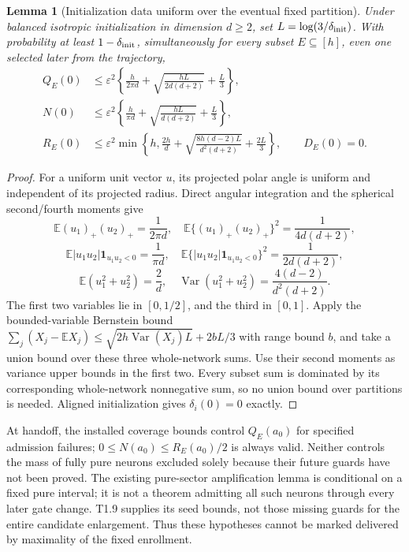 \documentclass{article} %
\theoremstyle{plain}
\newtheorem{lemma}[theorem]{Lemma}
\theoremstyle{definition}
\theoremstyle{remark}
\begin{document}
\begin{lemma}[Initialization data uniform over the eventual fixed partition]
\label{sbcouple:init}
Under balanced isotropic initialization in dimension $d\ge2$, set
$L=\log(3/\delta_{\rm init})$. With probability at least
$1-\delta_{\rm init}$, simultaneously for every subset $E\subseteq[h]$,
even one selected later from the trajectory,
\begin{align*}
 Q_E(0)&\le\varepsilon^2\left\{\frac{h}{2\pi d}
       +\sqrt{\frac{hL}{2d(d+2)}}+\frac L3\right\},\\
 N(0)&\le\varepsilon^2\left\{\frac{h}{\pi d}
       +\sqrt{\frac{hL}{d(d+2)}}+\frac L3\right\},\\
 R_E(0)&\le\varepsilon^2\min\left\{h,\frac{2h}d
       +\sqrt{\frac{8h(d-2)L}{d^2(d+2)}}+\frac{2L}3\right\},
 \qquad D_E(0)=0.
\end{align*}
\end{lemma}
\begin{proof}
For a uniform unit vector $u$, its projected polar angle is uniform and
independent of its projected radius. Direct angular integration and the
spherical second/fourth moments give
\[
 \mathbb E(u_1)_+(u_2)_+=\frac1{2\pi d},\quad
 \mathbb E\{(u_1)_+(u_2)_+\}^2=\frac1{4d(d+2)},
\]
\[
 \mathbb E|u_1u_2|\mathbf1_{u_1u_2<0}=\frac1{\pi d},\quad
 \mathbb E\{|u_1u_2|\mathbf1_{u_1u_2<0}\}^2=\frac1{2d(d+2)},
\]
\[
 \mathbb E(u_1^2+u_2^2)=\frac2d,\quad
 \operatorname{Var}(u_1^2+u_2^2)=\frac{4(d-2)}{d^2(d+2)}.
\]
The first two variables lie in $[0,1/2]$, and the third in $[0,1]$.
Apply the bounded-variable Bernstein bound
$\sum_j(X_j-\mathbb EX_j)\le\sqrt{2h\operatorname{Var}(X_j)L}
+2bL/3$ with range bound $b$, and take a union bound over these three
whole-network sums. Use their second moments as variance upper bounds
in the first two. Every subset sum is dominated by its corresponding
whole-network nonnegative sum, so no union bound over partitions is
needed. Aligned initialization gives $\delta_i(0)=0$ exactly.
\end{proof}

At handoff, the installed coverage bounds control $Q_E(a_0)$ for
specified admission failures; $0\le N(a_0)\le R_E(a_0)/2$ is always valid.
Neither controls the mass of fully pure neurons excluded solely because
their future guards have not been proved. The existing pure-sector
amplification lemma is conditional on a fixed pure interval; it is not
a theorem admitting all such neurons through every later gate change.
T1.9 supplies its seed bounds, not those missing guards for the entire
candidate enlargement. Thus these hypotheses cannot be marked delivered
by maximality of the fixed enrollment.
\end{document}
